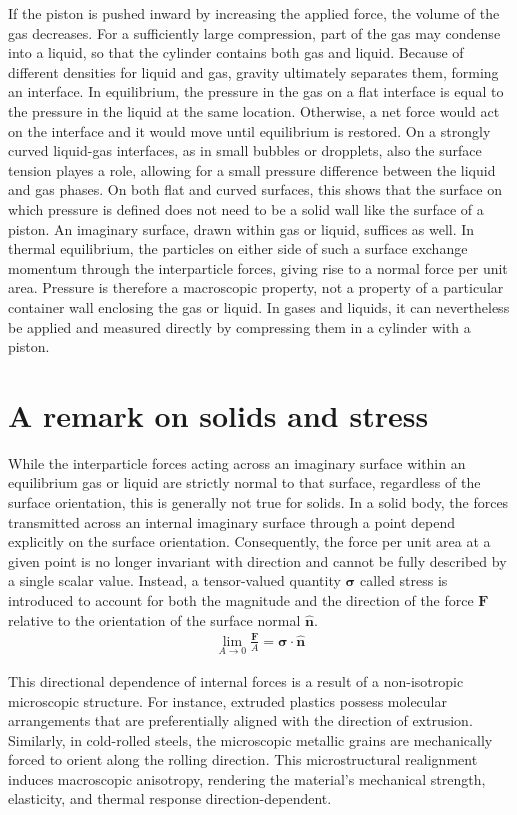 If the piston is pushed inward by increasing the applied force, the volume of the gas decreases. For a sufficiently large compression, part of the gas may condense into a liquid, so that the cylinder contains both gas and liquid. Because of different densities for liquid and gas, gravity ultimately separates them, forming an interface. In equilibrium, the pressure in the gas on a flat interface is equal to the pressure in the liquid at the same location. Otherwise, a net force would act on the interface and it would move until equilibrium is restored. On a strongly curved liquid-gas interfaces, as in small bubbles or dropplets, also the surface tension playes a role, allowing for a small pressure difference between the liquid and gas phases. On both flat and curved surfaces, this shows that the surface on which pressure is defined does not need to be a solid wall like the surface of a piston. An imaginary surface, drawn within gas or liquid, suffices as well. In thermal equilibrium, the particles on either side of such a surface exchange momentum through the interparticle forces, giving rise to a normal force per unit area. Pressure is therefore a macroscopic property, not a property of a particular container wall enclosing the gas or liquid. In gases and liquids, it can nevertheless be applied and measured directly by compressing them in a cylinder with a piston. 

\section{A remark on solids and stress}
While the interparticle forces acting across an imaginary surface within an equilibrium gas or liquid are strictly normal to that surface, regardless of the surface orientation, this is generally not true for solids. In a solid body, the forces transmitted across an internal imaginary surface through a point depend explicitly on the surface orientation. Consequently, the force per unit area at a given point is no longer invariant with direction and cannot be fully described by a single scalar value. Instead, a tensor-valued quantity $\bm{\sigma}$ called stress is introduced to account for both the magnitude and the direction of the force $\bm{F}$ relative to the orientation of the surface normal $\bm{\hat{n}}$.
\begin{align}
    \lim_{A\to 0}\frac{\bm{F}}{A}=\bm{\sigma}\cdot\bm{\hat{n}}
\end{align}

This directional dependence of internal forces is a result of a non-isotropic microscopic structure. For instance, extruded plastics possess molecular arrangements that are preferentially aligned with the direction of extrusion. Similarly, in cold-rolled steels, the microscopic metallic grains are mechanically forced to orient along the rolling direction. This microstructural realignment induces macroscopic anisotropy, rendering the material's mechanical strength, elasticity, and thermal response direction-dependent.

